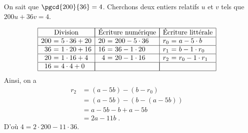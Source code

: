             \begin{ex}
                  On sait que $\pgcd{200}{36} = 4$.
                  Cherchons deux entiers relatifs $u$ et $v$ tels que $200 u + 36 v = 4$.
                  
                  \begin{displaymath}
                        \begin{array}{|r@{\ =\ }l|r@{\ =\ }l|r@{\ =\ }l|}
                              \hline
                              \multicolumn{2}{|c|}{\text{Division}} &
	                                     \multicolumn{2}{|c|}{\text{\'Ecriture num\'erique} } & 
	                                           \multicolumn{2}{|c|}{\text{\'Ecriture litt\'erale} } \\
                              \hline
                              200 & 5 \cdot 36 + 20 & 20 & 200 - 5 \cdot 36       & r_0  & a   - 5 \cdot b    \\
                              \hline
                              36  & 1 \cdot 20 + 16 & 16 & 36  - 1 \cdot 20       & r_1  & b   - 1 \cdot r_0  \\
                              \hline
                              20  & 1 \cdot 16 + 4  & 4  & 20  - 1 \cdot 16       & r_2  & r_0 - 1 \cdot r_1  \\
                              \hline
                              16  & 4 \cdot 4  + 0  & \multicolumn{2}{|c|}{}      & \multicolumn{2}{|c|}{}  \\
                              \hline
                        \end{array}
                  \end{displaymath}
                  Ainsi, on a 
                        \begin{align*}
                              r_2 & = (a-5b) - (b-r_0)       \\
                                  & = (a-5b) - (b-(a-5b))    \\
                                  & = a-5b-b+a-5b            \\
                                  & = 2a - 11 b              \;.
                        \end{align*}
                 D'o\`u $4 = 2 \cdot 200 - 11 \cdot 36$.
            \end{ex}

